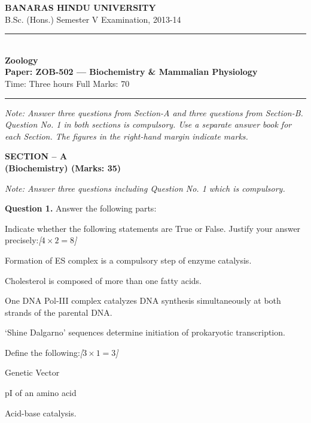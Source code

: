 \documentclass[11pt,a4paper]{article}
\newcommand{\pts}[1]{\hfill   \textit{[#1]}}
\begin{document}
\begin{center}
  {\large\bfseries BANARAS HINDU UNIVERSITY}\\[2pt]
  {\normalsize B.Sc. (Hons.) Semester V Examination, 2013-14}\\[6pt]
  \rule{0.8\linewidth}{0.5pt}\\[6pt]
  {\large\bfseries Zoology}\\[4pt]
  {\large\bfseries Paper: ZOB-502 --- Biochemistry \& Mammalian Physiology}\\[4pt]
  {\normalsize Time: Three hours \hfill Full Marks: 70}
\end{center}

\rule{\linewidth}{0.4pt}

\smallskip



\noindent   \textit{Note: Answer three questions from Section-A and three questions from Section-B. Question No. 1 in both sections is compulsory. Use a separate answer book for each Section. The figures in the right-hand margin indicate marks.}

\bigskip

\begin{center}
   \textbf{SECTION -- A} \\
   \textbf{(Biochemistry) (Marks: 35)}
\end{center}

\smallskip



\noindent   \textit{Note: Answer three questions including Question No. 1 which is compulsory.}

\medskip


\noindent   \textbf{Question 1.} Answer the following parts:

\begin{parts}
  \item Indicate whether the following statements are True or False. Justify your answer precisely:\pts{$4  \times 2 = 8$}
  
\begin{parts}
    \item Formation of ES complex is a compulsory step of enzyme catalysis.
    \item Cholesterol is composed of more than one fatty acids.
    \item One DNA Pol-III complex catalyzes DNA synthesis simultaneously at both strands of the parental DNA.
    \item `Shine Dalgarno' sequences determine initiation of prokaryotic transcription.
  \end{parts}

  \item Define the following:\pts{$3  \times 1 = 3$}
  
\begin{parts}
    \item Genetic Vector
    \item pI of an amino acid
    \item Acid-base catalysis.
  \end{parts}
\end{parts}
\end{document}
